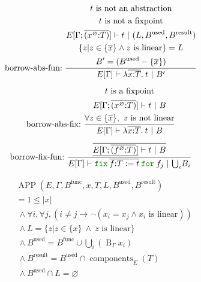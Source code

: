 \documentclass[a4paper,fleqn]{article}
\newcommand{\kwfix}{\mbox{\color{mygreen}\ttfamily fix}}
\newcommand{\kwfor}{\mbox{\color{mygreen}\ttfamily for}}
\newcommand{\lam}[2]{\lambda #1.\:#2}
\newcommand{\lassum}[2]{(#1\mathord{:}#2)}
\newcommand{\ofix}[2]{\kwfix\:{#1}\:\kwfor\:{#2}}
\newcommand{\tbigcup}{{\textstyle\bigcup}}
\newcommand{\breakrule}{\\[0.5em]}
\DeclareMathOperator{\APP}{APP}
\DeclareMathOperator{\components}{components}
\DeclareMathOperator{\Bop}{B}
\newcommand{\rep}[1]{\overline{#1}}
\begin{document}
\begin{gather*}
  \text{borrow-abs-fun:}~
    \dfrac{
      \begin{gathered}
        \text{$t$ is not an abstraction} \\
        \text{$t$ is not a fixpoint} \\
        E[\Gamma;\rep{\lassum{x^\varnothing}{T}}] \vdash t ~|~ (L,B^\text{used},B^\text{result}) \\
        \{ z | z \in \{\rep{x}\} \wedge \text{$z$ is linear} \} = L \\
        B' = (B^\text{used} - \{\rep{x}\}) \\
      \end{gathered}
    }{
      E[\Gamma] \vdash \lam{\rep{x{:}T}}{t} ~|~ B'
    } \breakrule
  \text{borrow-abs-fix:}~
    \dfrac{
      \begin{gathered}
        \text{$t$ is a fixpoint} \\
        E[\Gamma;\rep{\lassum{x^\varnothing}{T}}] \vdash t ~|~ B \\
        \forall z \in \{\rep{x}\},~ \text{$z$ is not linear} \\
      \end{gathered}
    }{
      E[\Gamma] \vdash \lam{\rep{x{:}T}}{t} ~|~ B
    } \breakrule
  \text{borrow-fix-fun:}~
    \dfrac{
      \begin{gathered}
        \rep{\underline{E[\Gamma;\rep{\lassum{f^\varnothing}{T}}]} \vdash t ~|~ B} \\
      \end{gathered}
    }{
      E[\Gamma] \vdash \ofix{\rep{f{:}T:=t}}{f_j} ~|~ {\tbigcup_i B_i}
    }
\end{gather*}

\begin{align*}
  &\APP(E, \Gamma, B^\text{func}, \rep{x}, T, L, B^\text{used}, B^\text{result}) \\
  &= 1 \leq |x| \\
  &~\wedge \forall i, \forall j, (i \neq j \rightarrow \neg (x_i = x_j \wedge \text{$x_i$ is linear})) \\
  &~\wedge L = \{ z | z \in \{\rep{x}\} ~\wedge~ \text{$z$ is linear} \} \\
  &~\wedge B^\text{used} = B^\text{func} \cup \tbigcup_i (\Bop_\Gamma x_i) \\
  &~\wedge B^\text{result} = B^\text{used} \cap \components_E(T) \\
  &~\wedge B^\text{used} \cap L = \varnothing \\
\end{align*}
\end{document}
